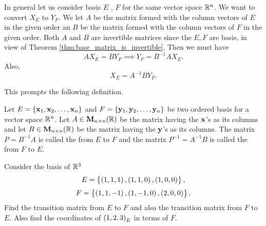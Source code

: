 \bigskip
In general let us consider  basis $E$ ,
$F$ for the same vector space $\mathbb{R}^n$. We want to convert
$X_{E}$ to $Y_{F}$. We let $A$ be the
matrix formed with the column vectors of $E$ in the
given order an $B$ be the matrix formed with the column vectors of
$F$ in the given order. Both $A$ and $B$ are
invertible matrices since the $E,F$ are basis, in view
of Theorem \ref{thm:base_matrix_is_invertible}. Then we must have
$$AX _{E} = BY_{F} \implies Y_{F} =
B^{-1}AX_{E}.
$$Also, $$X _{E} = A^{-1}BY_{F} . $$

This prompts the following definition.
\begin{df}
Let ${E} = \{\mathbf{ x}_1, \mathbf{ x}_2, \ldots, \mathbf{ x}_n\}$ and
${F} = \{\mathbf{ y}_1, \mathbf{ y}_2, \ldots, \mathbf{ y}_n\}$ be two
ordered  basis for a vector space $\mathbb{R}^n$.    Let $A\in {\mathbf M}_{n\times n}(
\mathbb{R} )$ be the matrix having the $\mathbf{ x}$'s as its columns and let
$B\in {\mathbf M}_{n\times n}( \mathbb{R} )$ be the matrix having the $\mathbf{ y}$'s as
its columns. The matrix $P = B^{-1}A$ is called the  from ${E}$ to ${F}$ and the matrix
$P^{-1} = A^{-1}B$ is called the  from
${F}$ to ${E}$. 
\end{df}
\begin{exa}
Consider the basis  of $\mathbb{R}^3$ $$ E= \left\{\left( 1 , 1 ,
1 \right), \left( 1 , 1 , 0 \right),  \left( 1 , 0 , 0 \right) \right\},
$$
 $$ F = \left\{\left( 1 , 1 ,
-1 \right), \left( 1 , -1 , 0 \right),  \left( 2 , 0 , 0 \right) \right\}.
$$Find the transition matrix from  ${E}$ to $F$ and also the transition matrix from  ${F}$ to
${E}$. Also find the coordinates of $\left( 1,
2 , 3 \right)_{E}$ in terms of $F$.
\end{exa}
